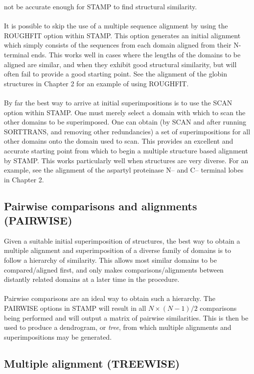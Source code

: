not be accurate enough for STAMP to find structural similarity. \\
\\
It is possible to skip the use of a multiple sequence alignment by 
using the ROUGHFIT option within STAMP.  This option generates an initial 
alignment which simply consists of the sequences from 
each domain aligned from their N-terminal ends.  This works well in
cases where the lengths of the domains to be aligned are similar,
and when they exhibit good structural similarity, but will often
fail to provide a good starting point.  See the alignment of the
globin structures in Chapter 2 for an example of using ROUGHFIT.\\
\\
By far the best way to arrive at initial superimpositions is to use
the SCAN option within STAMP.  One must merely select a domain with
which to scan the other domains to be superimposed.  
One can obtain (by SCAN and after running SORTTRANS, and 
removing other redundancies) a set of
superimpositions for all other domains onto the domain used to scan.  
This provides an excellent and accurate starting point from which to
begin a multiple structure based alignment by STAMP.  This works
particularly well when structures are very diverse.  For an
example, see the alignment of the aspartyl proteinase N-- and C--
terminal lobes in Chapter 2.

\subsection{Pairwise comparisons and alignments (PAIRWISE)}

Given a suitable initial superimposition of structures, 
the best way to obtain a multiple alignment and 
superimposition of a diverse family of domains is to follow a 
hierarchy of similarity.  This allows most similar domains to be 
compared/aligned first, and only makes comparisons/alignments
between distantly related domains at a later time in the procedure.\\
\\
Pairwise comparisons are an ideal way to obtain such a hierarchy. 
The PAIRWISE options in STAMP will result in all $N \times (N-1)/2$
comparisons being performed and will output a matrix of pairwise
similarities.  This is then be used to produce a
dendrogram, or {\em tree}, from which multiple alignments and
superimpositions may be generated.

\subsection{Multiple alignment (TREEWISE)}


